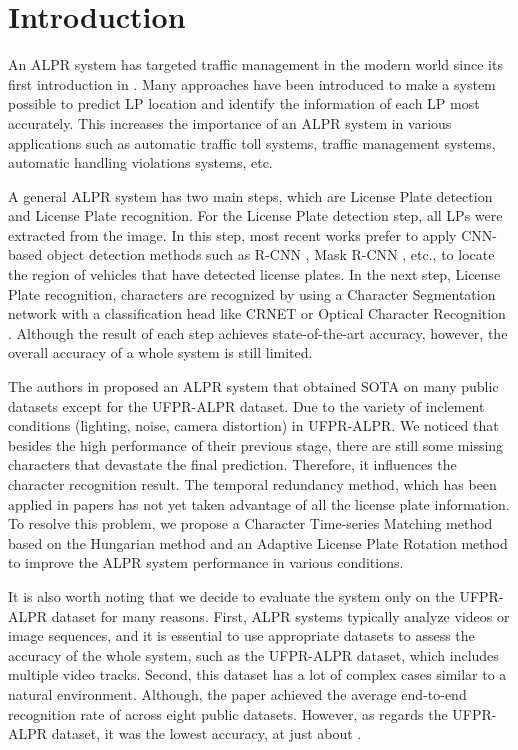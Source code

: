 \documentclass[conference]{IEEEtran}
\begin{document}
\section{Introduction} 

An ALPR system has targeted traffic management in the modern world since its first introduction in \cite{1990}. Many approaches have been introduced to make a system possible to predict LP location and identify the information of each LP most accurately. This increases the importance of an ALPR system in various applications such as automatic traffic toll systems, traffic management systems, automatic handling violations systems, etc.  

A general ALPR system has two main steps, which are License Plate detection and License Plate recognition. For the License Plate detection step, all LPs were extracted from the image. In this step, most recent works prefer to apply CNN-based object detection methods such as R-CNN \cite{rcnn}, Mask R-CNN \cite{maskrcnn}, etc., to locate the region of vehicles that have detected license plates. In the next step, License Plate recognition, characters are recognized by using a Character Segmentation network with a classification head like CRNET \cite{crnet} or Optical Character Recognition \cite{ocr}. Although the result of each step achieves state-of-the-art accuracy, however, the overall accuracy of a whole system is still limited. 

 The authors in \cite{layout} proposed an ALPR system that obtained SOTA on many public datasets except for the UFPR-ALPR dataset. Due to the variety of inclement conditions (lighting, noise, camera distortion) in UFPR-ALPR. We noticed that besides the high performance of their previous stage, there are still some missing characters that devastate the final prediction. Therefore, it influences the character recognition result. The temporal redundancy method, which has been applied in papers \cite{ufpr,layout,temporal} has not yet taken advantage of all the license plate information. To resolve this problem, we propose a Character Time-series Matching method based on the Hungarian method and an Adaptive License Plate Rotation method to improve the ALPR system performance in various conditions. 

It is also worth noting that we decide to evaluate the system only on the UFPR-ALPR dataset for many reasons. First, ALPR systems typically analyze videos or image sequences, and it is essential to use appropriate datasets to assess the accuracy of the whole system, such as the UFPR-ALPR dataset, which includes multiple video tracks. Second, this dataset has a lot of complex cases similar to a natural environment. Although, the paper \cite{layout} achieved the average end-to-end recognition rate of  across eight public datasets. However, as regards the UFPR-ALPR dataset, it was the lowest accuracy, at just about  \cite{layout}.
\end{document}
